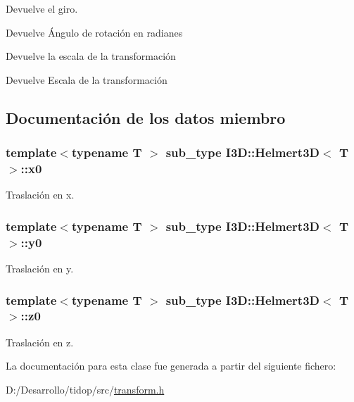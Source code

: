 Devuelve el giro. 

\begin{DoxyReturn}{Devuelve}
Ángulo de rotación en radianes
\end{DoxyReturn}
Devuelve la escala de la transformación \begin{DoxyReturn}{Devuelve}
Escala de la transformación 
\end{DoxyReturn}


\subsection{Documentación de los datos miembro}
\subsubsection[{\texorpdfstring{x0}{x0}}]{\setlength{\rightskip}{0pt plus 5cm}template$<$typename T $>$ {\bf sub\+\_\+type} {\bf I3\+D\+::\+Helmert3D}$<$ T $>$\+::x0}\hypertarget{class_i3_d_1_1_helmert3_d_a57421e1c701909b5a319dfeaba50fe20}{}\label{class_i3_d_1_1_helmert3_d_a57421e1c701909b5a319dfeaba50fe20}


Traslación en x. 

\subsubsection[{\texorpdfstring{y0}{y0}}]{\setlength{\rightskip}{0pt plus 5cm}template$<$typename T $>$ {\bf sub\+\_\+type} {\bf I3\+D\+::\+Helmert3D}$<$ T $>$\+::y0}\hypertarget{class_i3_d_1_1_helmert3_d_a8367d52bdb3d60a015e9c30ce7ccacde}{}\label{class_i3_d_1_1_helmert3_d_a8367d52bdb3d60a015e9c30ce7ccacde}


Traslación en y. 

\subsubsection[{\texorpdfstring{z0}{z0}}]{\setlength{\rightskip}{0pt plus 5cm}template$<$typename T $>$ {\bf sub\+\_\+type} {\bf I3\+D\+::\+Helmert3D}$<$ T $>$\+::z0}\hypertarget{class_i3_d_1_1_helmert3_d_aaa4da06457bac6b987d41a93b9d29d1e}{}\label{class_i3_d_1_1_helmert3_d_aaa4da06457bac6b987d41a93b9d29d1e}


Traslación en z. 



La documentación para esta clase fue generada a partir del siguiente fichero\+:\begin{DoxyCompactItemize}
\item 
D\+:/\+Desarrollo/tidop/src/\hyperlink{transform_8h}{transform.\+h}\end{DoxyCompactItemize}
